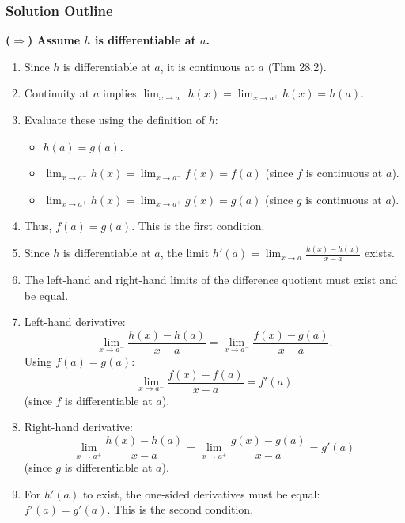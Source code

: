 \documentclass{article}
\begin{document}
\subsubsection*{Solution Outline}

\textbf{($\Rightarrow$) Assume \(h\) is differentiable at \(a\).}
\begin{enumerate}
    \item Since \(h\) is differentiable at \(a\), it is continuous at \(a\) (Thm 28.2).
    \item Continuity at \(a\) implies \(\lim_{x \to a^-} h(x) = \lim_{x \to a^+} h(x) = h(a)\).
    \item Evaluate these using the definition of \(h\):
    \begin{itemize}
        \item \(h(a) = g(a)\).
        \item \(\lim_{x \to a^-} h(x) = \lim_{x \to a^-} f(x) = f(a)\) (since \(f\) is continuous at \(a\)).
        \item \(\lim_{x \to a^+} h(x) = \lim_{x \to a^+} g(x) = g(a)\) (since \(g\) is continuous at \(a\)).
    \end{itemize}
    \item Thus, \(f(a) = g(a)\). This is the first condition.
    \item Since \(h\) is differentiable at \(a\), the limit \(h'(a) = \lim_{x \to a} \frac{h(x) - h(a)}{x - a}\) exists.
    \item The left-hand and right-hand limits of the difference quotient must exist and be equal.
    \item Left-hand derivative:
    \[ \lim_{x \to a^-} \frac{h(x) - h(a)}{x - a} = \lim_{x \to a^-} \frac{f(x) - g(a)}{x - a}. \]
    Using \(f(a) = g(a)\):
    \[ \lim_{x \to a^-} \frac{f(x) - f(a)}{x - a} = f'(a) \]
    (since \(f\) is differentiable at \(a\)).
    \item Right-hand derivative:
    \[ \lim_{x \to a^+} \frac{h(x) - h(a)}{x - a} = \lim_{x \to a^+} \frac{g(x) - g(a)}{x - a} = g'(a) \]
    (since \(g\) is differentiable at \(a\)).
    \item For \(h'(a)\) to exist, the one-sided derivatives must be equal: \(f'(a) = g'(a)\). This is the second condition.
\end{enumerate}
\end{document}
